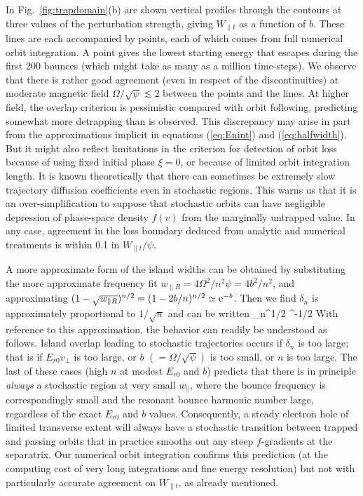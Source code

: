 \documentclass{agujournal2019}
\let\oldequation\equation
\let\oldendequation\endequation
\renewenvironment{equation}
  {\linenomathNonumbers\oldequation}
  {\oldendequation\endlinenomath}
\def\citep{\cite}
\def\wp{w_\parallel}
\def\wr{w_{\parallel R}}
\begin{document}
In Fig.\ \ref{fig:trapdomain}(b) are shown vertical profiles through
the contours at three values of the perturbation strength, giving
$W_{\parallel t}$ as a function of $b$. These lines are each
accompanied by points, each of which comes from full numerical orbit
integration. A point gives the lowest starting energy that escapes
during the first 200 bounces (which might take as many as a million
time-steps). We observe that there is rather good agreement (even in
respect of the discontinuities) at moderate magnetic field
$\Omega/\sqrt{\psi}\lesssim 2$ between the points and the lines. At
higher field, the overlap criterion is pessimistic compared with orbit
following, predicting somewhat more detrapping than is observed.  This
discrepancy may arise in part from the approximations implicit in
equations (\ref{eq:Enint}) and (\ref{eq:halfwidth}). But it might also
reflect limitations in the criterion for detection of orbit loss
because of using fixed initial phase $\xi=0$, or because of limited
orbit integration length.  It is known theoretically \citep{Meiss1992}
that there can sometimes be extremely slow trajectory diffusion
coefficients even in stochastic regions. This warns us that it is an
over-simplification to suppose that stochastic orbits can have
negligible depression of phase-space density $f(v)$ from the
marginally untrapped value. In any case, agreement in the loss
boundary deduced from analytic and numerical treatments is within 0.1
in $W_{\parallel t}/\psi$.

A more approximate form of the island widths can be obtained by 
substituting the more approximate frequency fit 
$\wr =4\Omega^2/n^2\psi=4b^2/n^2$, and
approximating $(1-\sqrt{\wr })^{n/2}
=(1-2b/n)^{n/2}\simeq
{\rm e}^{-b}$. Then we find $\delta_n$ is
approximately proportional to $1/\sqrt{n}$ and can be
written
\begin{equation}
  \label{eq:halfomega}
 \delta_n\simeq{}^{1/2}
 ^{-1/2}
\end{equation}
With reference to this approximation, the behavior can readily be
understood as follows. Island overlap leading to stochastic
trajectories occurs if $\delta_n$ is too large; that is if $E_{r0}v_\perp$ is too
large, or $b$ $(=\Omega/\sqrt\psi)$ is too small, or $n$ is too
large. The last of these cases (high $n$
at modest $E_{r0}$ and $b$) predicts that there is in principle
\emph{always} a stochastic region at very small $\wp$, where the
bounce frequency is correspondingly small and the resonant bounce
harmonic number large, regardless of the exact $E_{r0}$ and $b$
values. Consequently, a steady electron hole of limited transverse
extent will always have a stochastic transition between trapped and
passing orbits that in practice smooths out any steep $f$-gradients at
the separatrix. Our numerical orbit integration confirms this
prediction (at the computing cost of very long integrations and fine
energy resolution) but not with particularly accurate
agreement on $W_{\parallel t}$, as already mentioned.
\end{document}

